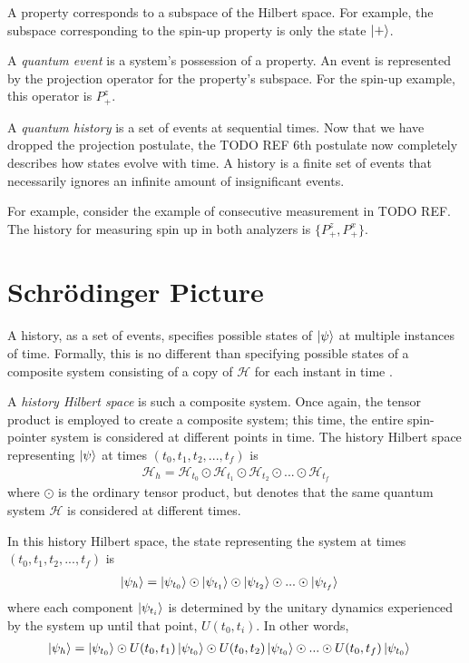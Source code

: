 A property corresponds to a subspace of the Hilbert space. For example, the subspace corresponding to the spin-up property is only the state $\ket{+}$.

A \textit{quantum event} is a system's possession of a property. An event is represented by the projection operator for the property's subspace. For the spin-up example, this operator is $P^z_+$.

A \textit{quantum history} is a set of events at sequential times. Now that we have dropped the projection postulate, the TODO REF 6th postulate now completely describes how states evolve with time. A history is a finite set of events that necessarily ignores an infinite amount of insignificant events.

For example, consider the example of consecutive measurement in TODO REF. The history for measuring spin up in both analyzers is $\{P^z_+, P^x_+\}$.

\section{Schrödinger Picture}
A history, as a set of events, specifies possible states of $\ket{\psi}$ at multiple instances of time. Formally, this is no different than specifying possible states of a composite system consisting of a copy of $\mathcal{H}$ for each instant in time \cite{Griffiths}.

A \textit{history Hilbert space} is such a composite system. Once again, the tensor product is employed to create a composite system; this time, the entire spin-pointer system is considered at different points in time. The history Hilbert space representing $\ket{\psi}$ at times $\left(t_0, t_1, t_2, ..., t_f \right)$ is
\begin{align}
  {\mathcal{H}}_h = \mathcal{H}_{t_0} \odot \mathcal{H}_{t_1} \odot \mathcal{H}_{t_2} \odot ... \odot \mathcal{H}_{t_f}
\end{align}
where $\odot$ is the ordinary tensor product, but denotes that the same quantum system $\mathcal{H}$ is considered at different times.

In this history Hilbert space, the state representing the system at times $\left(t_0, t_1, t_2, ..., t_f \right)$ is
\begin{align}
  \ket{\psi_h} &= \ket{\psi_{t_0}} \odot \ket{\psi_{t_1}} \odot \ket{\psi_{t_2}} \odot ... \odot \ket{\psi_{t_f}}
\end{align}
where each component $\ket{\psi_{t_i}}$ is determined by the unitary dynamics experienced by the system up until that point, $U(t_0, t_i)$. In other words,
\begin{align}
  \ket{\psi_h} &= \ket{\psi_{t_0}} \odot U(t_0, t_1)\ket{\psi_{t_0}} \odot U(t_0, t_2)\ket{\psi_{t_0}} \odot ... \odot U(t_0, t_f)\ket{\psi_{t_0}}
\end{align}

